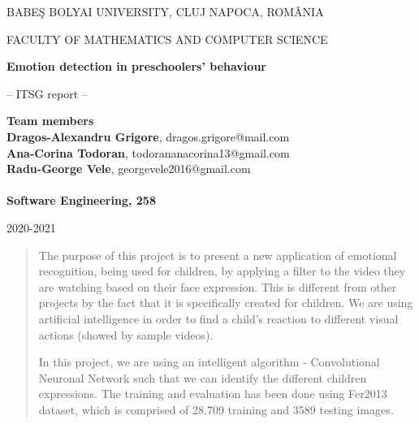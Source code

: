 \documentclass[runningheads,a4paper,11pt]{report}
\begin{document}
\begin{titlepage}
\sloppy

\begin{center}
BABE\c S BOLYAI UNIVERSITY, CLUJ NAPOCA, ROM\^ ANIA

FACULTY OF MATHEMATICS AND COMPUTER SCIENCE

\vspace{6cm}

\Huge \textbf{Emotion detection in preschoolers' behaviour}

\vspace{1cm}

\normalsize -- ITSG report --

\end{center}


\vspace{5cm}

\begin{flushright}
\Large{\textbf{Team members}}\\
\textbf{Dragos-Alexandru Grigore}, dragos.grigore@mail.com \\
\textbf{Ana-Corina Todoran}, todorananacorina13@gmail.com \\
\textbf{Radu-George Vele}, georgevele2016@gmail.com \\
\\
\textbf{Software Engineering, 258}
\end{flushright}

\vspace{2cm}

\begin{center}
2020-2021
\end{center}

\end{titlepage}



\begin{abstract}

The purpose of this project is to present a new application of emotional recognition, being used for children, by applying a filter to the video they are watching based on their face expression. This is different from other projects by the fact that it is specifically created for children. We are using artificial intelligence in order to find a child's reaction to different visual actions (showed by sample videos).

In this project, we are using an intelligent algorithm - Convolutional Neuronal Network such that we can identify the different children expressions. The training and evaluation has been done using Fer2013 dataset, which is comprised of 28.709 training and 3589 testing images.

\end{abstract}
\end{document}
